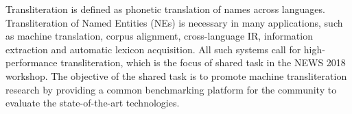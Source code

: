 Transliteration is defined as phonetic translation of names across languages. Transliteration of Named Entities (NEs) is necessary in many applications, such as machine translation, corpus alignment, cross-language IR, information extraction and automatic lexicon acquisition. All such systems call for high-performance transliteration, which is the focus of shared task in the NEWS 2018 workshop. The objective of the shared task is to promote machine transliteration research by providing a common benchmarking platform for the community to evaluate the state-of-the-art technologies.
